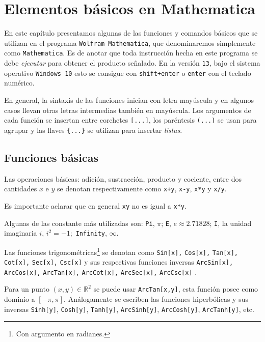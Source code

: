 \chapter{Elementos básicos en Mathematica}

En este capítulo presentamos algunas de las funciones y comandos
básicos que se utilizan en el programa \verb"Wolfram Mathematica", que denominaremos simplemente
como \verb"Mathematica". Es de anotar que toda instrucción hecha en este programa se debe \emph{ejecutar} para obtener el producto señalado. En la versión \verb"13", bajo el sistema operativo \verb"Windows 10" esto se consigue con \verb"shift+enter" o \verb"enter" con el teclado numérico.

En general, la sintaxis de las funciones inician con letra mayúscula
y en algunos casos llevan otras letras intermedias también en mayúscula. Los argumentos de cada función se insertan entre
corchetes \verb"[...]", los paréntesis \verb"(...)" se usan para agrupar y las llaves \verb"{...}" se utilizan para insertar \emph{listas}.

\section{Funciones básicas}
Las operaciones básicas: adición, sustracción, producto y cociente, entre dos cantidades $x$ e $y$ se denotan respectivamente como \verb"x+y", \verb"x-y", \verb"x*y" y \verb"x/y".

\begin{tcolorbox}[title=Advertencia]
  Es importante aclarar que en general \verb"xy" no es igual a \verb"x*y".
\end{tcolorbox}
Algunas de las constante más utilizadas son: \verb"Pi", $\pi$; \verb"E", $e \approx 2.71828$;
\verb"I", la unidad imaginaria $i$, $i^{2}= -1;$ \verb"Infinity", $\infty$.

Las funciones trigonométricas\footnote{Con argumento en radianes.} se denotan como
{\small
  \verb"Sin[x]," \verb"Cos[x]," \verb"Tan[x]," \verb"Cot[x],"
  \verb"Sec[x]," \verb"Csc[x]"
}
y sus respectivas funciones inversas
{\small
  \verb"ArcSin[x]," \verb"ArcCos[x],"
  \verb"ArcTan[x]," \verb"ArcCot[x],"
  \verb"ArcSec[x]," \verb"ArcCsc[x]"
}\!.

Para un punto $(x,y) \in \mathbb{R}^2$ se puede usar  \verb"ArcTan[x,y]", esta función posee como dominio a $[-\pi,\pi]$.
Análogamente se escriben las funciones hiperbólicas y sus inversas \verb"Sinh[y]",  \verb"Cosh[y]", \verb"Tanh[y]", \verb"ArcSinh[y]", \verb"ArcCosh[y]", \verb"ArcTanh[y]", etc.

